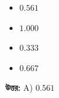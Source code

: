 \documentclass[12pt, a4paper]{article}
\begin{document}
\begin{itemize}[label={}, leftmargin=1cm, itemsep=0.5em]
\item[\textbf{A)}] $0.561$
\item[\textbf{B)}] $1.000$
\item[\textbf{C)}] $0.333$
\item[\textbf{D)}] $0.667$
\end{itemize}

\vspace{0.5em}
\begin{tcolorbox}[answerbox]
\textbf{\color{success} উত্তর:} A) $0.561$
\end{tcolorbox}
\vspace{1em}
\end{document}
